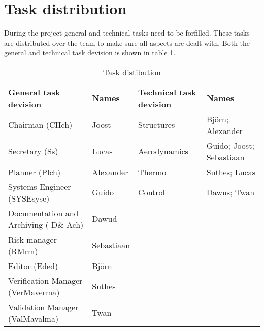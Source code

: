 \section{Task distribution}
During the project general and technical tasks need to be forfilled. These tasks are distributed over the team to make sure all aspects are dealt with. Both the general and technical task devision is shown in table \ref{tab:taskdist}.

\begin{table}[H]
	\caption {Task distibution}
    \begin{tabular}{|p{}|p{}|p{}|p{}|}
    \hline
    General task devision                 & Names      & Technical task devision & Names                    \\ \hline \hline
    Chairman (CH\gls{ch})                         & Joost      & Structures              & Bj\"{o}rn; Alexander         \\ \hline
    Secretary (S\gls{s})                         & Lucas      & Aerodynamics            & Guido; Joost; Sebastiaan \\ \hline
    Planner (Pl\gls{ch})                         & Alexander  & Thermo                  & Suthes; Lucas            \\ \hline
    Systems Engineer (SYSE\gls{syse})                 & Guido      & Control                 & Dawus; Twan              \\ \hline
    Documentation and Archiving ( D\& A\gls{ch}) & Dawud      & ~                       & ~                        \\ \hline
    Risk manager (RM\gls{rm})                   & Sebastiaan & ~                       & ~                        \\ \hline
    Editor (Ed\gls{ed})                           & Bj\"{o}rn      & ~                       & ~                        \\ \hline
    Verification Manager (VerMa\gls{verma})                    & Suthes     & ~                       & ~                        \\ \hline
    Validation Manager (ValMa\gls{valma})                      & Twan       & ~                       & ~                        \\ \hline
    \end{tabular}
    \label{tab:taskdist}
\end{table}